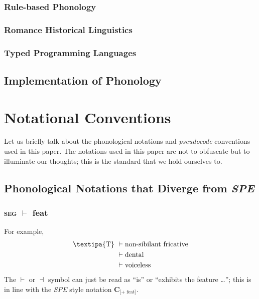 \documentclass{report}[12pt]
\begin{document}
\subsection*{Rule-based Phonology}

\subsection*{Romance Historical Linguistics}

\subsection*{Typed Programming Languages}

\section*{Implementation of Phonology}

\chapter*{Notational Conventions}

Let us briefly talk about the phonological notations and \emph{pseudocode} conventions used in this paper. The notations used in this paper are not to obfuscate but to illuminate our thoughts; this is the standard that we hold ourselves to.

\section*{Phonological Notations that Diverge from \emph{SPE}}

\subsection*{\textsc{seg} $\vdash$ feat}

For example,
\begin{align*}
  \text{\textipa{T}}\ & \vdash \text{non-sibilant fricative} \\
                     & \vdash \text{dental} \\
                     & \vdash \text{voiceless} 
\end{align*}
The $\vdash$ or $\dashv$ symbol can just be read as ``is'' or ``exhibits the feature \dots''; this is in line with the \emph{SPE} style \cite{spe} notation $\textbf{C}_{\text{[+\ feat]}}$.
\end{document}
